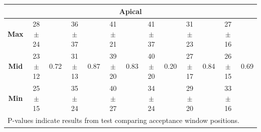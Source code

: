 \begin{table}
\begin{tabular}{ccccccccccccc}
			\multicolumn{13}{c}{\textbf{Apical}} \\
			\midrule
			\textbf{Max} & 28$\pm$24 & \multirow{3}{*}{0.72} & 36$\pm$37 & \multirow{3}{*}{0.87} & 41$\pm$21 & \multirow{3}{*}{0.83}
			& 41$\pm$37 & \multirow{3}{*}{0.20} & 31$\pm$23 & \multirow{3}{*}{0.84} & 27$\pm$16 & \multirow{3}{*}{0.69} \\
			\textbf{Mid} & 23$\pm$12 &                       & 31$\pm$13 &                       & 39$\pm$20 & 
			& 40$\pm$20 &                       & 27$\pm$17 &                       & 26$\pm$15 &                       \\
			\textbf{Min} & 25$\pm$15 &                       & 35$\pm$24 &                       & 40$\pm$27 & 
			& 34$\pm$24 &                       & 29$\pm$20 &                       & 33$\pm$16 &  \\ 
			\bottomrule
			\multicolumn{13}{l}{P-values indicate results from test comparing acceptance window positions.}
		\end{tabular}
	\end{table}

